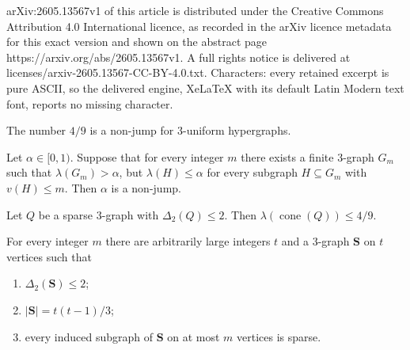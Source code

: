 \documentclass[10pt,a4paper]{amsart}
\newcommand{\La}{\lambda}
\newcommand{\Sint}{\mathbf{S}}
\newcommand{\cone}{\operatorname{cone}}
\begin{document}
arXiv:2605.13567v1 of this article is distributed under the Creative Commons Attribution 4.0 International licence, as recorded in the arXiv licence metadata for this exact version and shown on the abstract page https://arxiv.org/abs/2605.13567v1. A full rights notice is delivered at licenses/arxiv-2605.13567-CC-BY-4.0.txt. Characters: every retained excerpt is pure ASCII, so the delivered engine, XeLaTeX with its default Latin Modern text font, reports no missing character.
\begin{theorem}\label{thm:main}
    The number $4/9$ is a non-jump for $3$-uniform hypergraphs.
\end{theorem}

\begin{lemma}\label{lem:FR-criterion}
Let $\alpha\in[0,1)$. Suppose that for every integer $m$ there exists a finite $3$-graph $G_m$ such that $\La(G_m)>\alpha$, but $\La(H)\le \alpha$ for every subgraph $H\subseteq G_m$ with $v(H)\le m$. Then $\alpha$ is a non-jump.
\end{lemma}

\begin{theorem}\label{thm:local-cone}
Let $Q$ be a sparse $3$-graph with $\Delta_2(Q)\le2$. Then $\La(\cone(Q))\le 4/9$.
\end{theorem}

\begin{lemma}\label{lem:code}
For every integer $m$ there are arbitrarily large integers $t$ and a $3$-graph $\Sint$ on $t$ vertices such that
\begin{enumerate}[label=(\roman*)]
\item $\Delta_2(\Sint)\le2$;
\item $|\Sint|=t(t-1)/3$;
\item every induced subgraph of $\Sint$ on at most $m$ vertices is sparse.
\end{enumerate}
\end{lemma}
\end{document}
